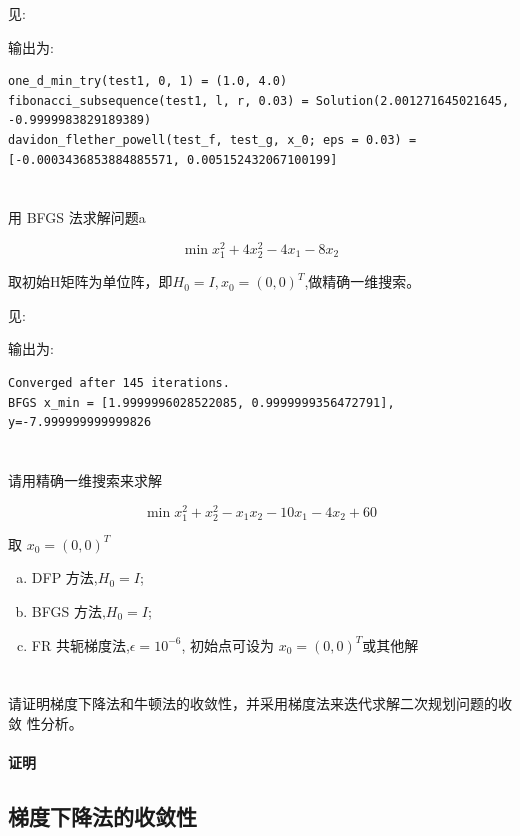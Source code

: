 \documentclass[a4paper]{article}
\begin{document}
见:

输出为:
\begin{lstlisting}
one_d_min_try(test1, 0, 1) = (1.0, 4.0)
fibonacci_subsequence(test1, l, r, 0.03) = Solution(2.001271645021645, -0.9999983829189389)
davidon_flether_powell(test_f, test_g, x_0; eps = 0.03) = [-0.0003436853884885571, 0.005152432067100199]
\end{lstlisting}

\section{}

用 BFGS 法求解问题a

\[\min x_1^2 + 4x_2^2 - 4x_1 -8x_2\]

取初始H矩阵为单位阵，即$H_0 = I, x_0 = (0,0)^T$,做精确一维搜索。


见:

输出为:
\begin{lstlisting}
Converged after 145 iterations.
BFGS x_min = [1.9999996028522085, 0.9999999356472791], y=-7.999999999999826
\end{lstlisting}

\section{}

请用精确一维搜索来求解

\[\min x_1^2 + x_2^2 - x_1x_2 -10x_1 - 4x_2 + 60\]

取 $x_0 = (0,0)^T$

\begin{enumerate}[(a)]
    \item DFP 方法,$H_0 = I$;
    \item BFGS 方法,$H_0 = I$;
    \item FR 共轭梯度法,$\epsilon = 10^{-6}$, 初始点可设为 $x_0 = (0,0)^T$或其他解
\end{enumerate}

\section{}
请证明梯度下降法和牛顿法的收敛性，并采用梯度法来迭代求解二次规划问题的收敛
性分析。

\paragraph{证明}

\subsection{梯度下降法的收敛性}
\end{document}
